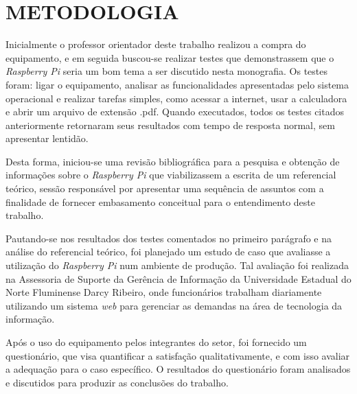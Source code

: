 \chapter{METODOLOGIA}



Inicialmente o professor orientador deste trabalho realizou a compra do equipamento, e em seguida buscou-se realizar testes que demonstrassem que o \textit{Raspberry Pi} seria um bom tema a ser discutido nesta monografia. Os testes foram: ligar o equipamento, analisar as funcionalidades apresentadas pelo sistema operacional e realizar tarefas simples, como acessar a internet, usar a calculadora e abrir um arquivo de extensão .pdf. Quando executados, todos os testes citados anteriormente retornaram seus resultados com tempo de resposta normal, sem apresentar lentidão.

Desta forma, iniciou-se uma revisão bibliográfica para a pesquisa e obtenção de informações sobre o \textit{Raspberry Pi} que viabilizassem a escrita de um referencial teórico, sessão responsável por apresentar uma sequência de assuntos com a finalidade de fornecer embasamento conceitual para o entendimento deste trabalho.

Pautando-se nos resultados dos testes comentados no primeiro parágrafo e na análise do referencial teórico, foi planejado um estudo de caso que avaliasse a utilização do \textit{Raspberry Pi} num ambiente de produção. Tal avaliação foi realizada na Assessoria de Suporte da Gerência de Informação da Universidade Estadual do Norte Fluminense Darcy Ribeiro, onde funcionários trabalham diariamente utilizando um sistema \textit{web} para gerenciar as demandas na área de tecnologia da informação.

Após o uso do equipamento pelos integrantes do setor, foi fornecido um questionário, que visa quantificar a satisfação qualitativamente, e com isso avaliar a adequação para o caso específico. O resultados do questionário foram analisados e discutidos para produzir as conclusões do trabalho.